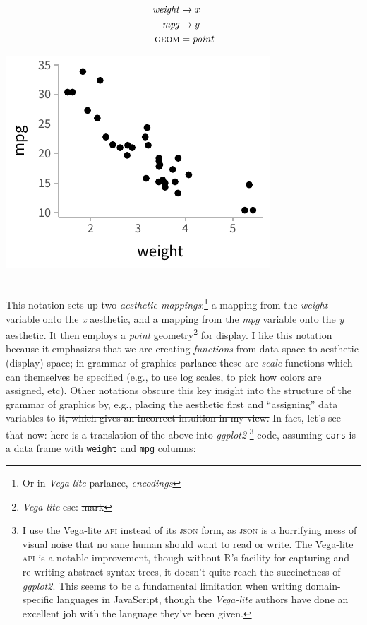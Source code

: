 \documentclass[journal]{vgtc}                     %
\newcommand{\equationfigure}[2]{%
\noindent
\begin{minipage}{.5\columnwidth}
\setlength{\abovedisplayskip}{0pt} %
\setlength{\belowdisplayskip}{0pt} %
#1\end{minipage}%
\begin{minipage}{.4\columnwidth}\centering #2 \end{minipage}%
\vspace{.5\belowdisplayskip}\\
}
\providecommand{\DIFadd}[1]{{\protect\color{blue}\uwave{#1}}} %
\providecommand{\DIFdel}[1]{{\protect\color{red}\sout{#1}}}                      %
\providecommand{\DIFaddbegin}{} %
\providecommand{\DIFaddend}{} %
\providecommand{\DIFdelbegin}{} %
\providecommand{\DIFdelend}{} %
\begin{document}
\equationfigure{
\begin{align*}
\mathit{weight} &\rightarrow x\\
\mathit{mpg} &\rightarrow y\\
\textsc{geom} &= \mathit{point}
\end{align*}
}{\includegraphics[width=1.2\columnwidth]{figs/2-mpg_v_weight.pdf}}
This notation sets up two \textit{aesthetic mappings}:\footnote{Or in \textit{Vega-lite} parlance, \textit{encodings}} a mapping from the \textit{weight} variable onto the \textit{x} aesthetic, and a mapping from the \textit{mpg} variable onto the \textit{y} aesthetic. It then employs a \textit{point} geometry\footnote{\textit{Vega-lite}-ese: \DIFdelbegin \DIFdel{mark}\DIFdelend \DIFaddbegin \textit{\DIFadd{mark}}\DIFaddend } for display. I like this notation because it emphasizes that we are creating \textit{functions} from data space to aesthetic (display) space; in grammar of graphics parlance these are \textit{scale} functions which can themselves be specified (e.g., to use log scales, to pick how colors are assigned, etc). Other notations obscure this key insight into the structure of the grammar of graphics by, e.g., placing the aesthetic first and ``assigning'' data variables to it\DIFdelbegin \DIFdel{, which gives an incorrect intuition in my view.
}\DIFdelend \DIFaddbegin \DIFadd{.
}\DIFaddend In fact, let's see that now: here is a translation of the above into \textit{ggplot2} \DIFaddbegin \DIFadd{and }\textit{\DIFadd{Vega-lite}}\footnote{I use the Vega-lite \textsc{api} instead of its \textsc{json} form, as \textsc{json} is a horrifying mess of visual noise that no sane human should want to read or write. The Vega-lite \textsc{api} is a notable improvement, though without R's facility for capturing and re-writing abstract syntax trees, it doesn't quite reach the succinctness of \textit{ggplot2}. This seems to be a fundamental limitation when writing domain-specific languages in JavaScript, though the \textit{Vega-lite} authors have done an excellent job with the language they've been given.} \DIFaddend code, assuming \texttt{cars} is a data frame with \texttt{weight} and \texttt{mpg} columns:
\end{document}
